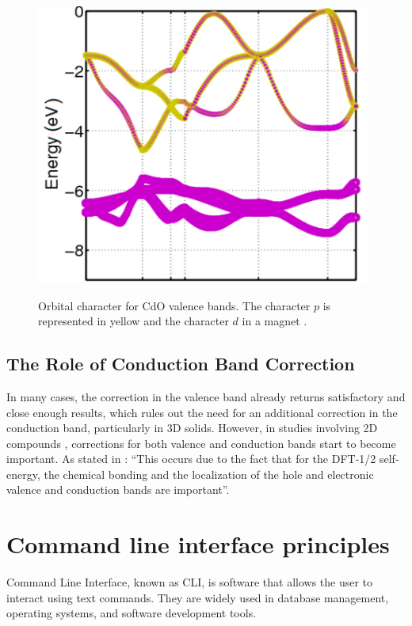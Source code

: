 \begin{figure}[!ht]
        \centering
        \includegraphics[width=11cm,height=10cm]{images/cdo_bands.png}
        \caption{Orbital character for CdO valence bands. The character $p$ is represented in yellow and the character $d$ in a magnet \cite{PhysRevB.95.045126}.}
        \label{cdo-bands}
\end{figure}



\subsection{The Role of Conduction Band Correction}
In many cases, the correction in the valence band already returns satisfactory and close enough results, which rules out the need for an additional correction in the conduction band, particularly in 3D solids. However, in studies involving 2D compounds \cite{PhysRevB.97.045426}, corrections for both valence and conduction bands start to become important. As stated in \cite{PhysRevB.97.045426}: ``This occurs due to the fact that for the DFT-1/2 self-energy, the chemical bonding and the localization of the hole and electronic valence and conduction bands are important''.


\section{Command line interface principles}
Command Line Interface, known as CLI, is software that allows the user to interact using text commands. They are widely used in database management, operating systems, and software development tools.

